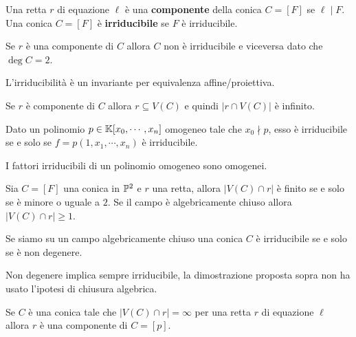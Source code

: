 \begin{multicols*}{2}
    \begin{definition}
    Una retta $r$ di equazione $\ell$ \`e una \textbf{componente} della conica $C=[F]$ se $\ell\mid F$.\\
    Una conica $C=[F]$ \`e \textbf{irriducibile} se $F$ \`e irriducibile.
    \end{definition}
    \begin{remark}
    Se $r$ \`e una componente di $C$ allora $C$ non \`e irriducibile e viceversa dato che $\deg C=2$.
    \end{remark}
    \begin{remark}
    L'irriducibilit\`a \`e un invariante per equivalenza affine/proiettiva.
    \end{remark}
    \begin{remark}
    Se $r$ \`e componente di $C$ allora $r\subseteq V(C)$ e quindi $|r\cap V(C)|$ \`e infinito.
    \end{remark}


    \begin{lemma}
    Dato un polinomio $p\in \mathbb{K}[x_0,\cdots,x_n]$ omogeneo tale che $x_0\nmid p$, esso \`e irriducibile se e solo se $f=p(1,x_1,\cdots, x_n)$ \`e irriducibile.
    \end{lemma}
    \begin{remark}
    I fattori irriducibili di un polinomio omogeneo sono omogenei.
    \end{remark}



    \begin{proposition}
    Sia $C=[F]$ una conica in $\mathbb{P}^2$ e $r$ una retta, allora $|V(C)\cap r|$ \`e finito se e solo se \`e minore o uguale a $2$. Se il campo \`e algebricamente chiuso allora $|V(C)\cap r|\geq 1$.
    \end{proposition}



    \begin{proposition}
    Se siamo su un campo algebricamente chiuso una conica $C$ \`e irriducibile se e solo se \`e non degenere.
    \end{proposition}
    \begin{remark}
    Non degenere implica sempre irriducibile, la dimostrazione proposta sopra non ha usato l'ipotesi di chiusura algebrica.
    \end{remark}

    \begin{proposition}
    Se $C$ \`e una conica tale che $|V(C)\cap r|=\infty$ per una retta $r$ di equazione $\ell$ allora $r$ \`e una componente di $C=[p]$.
    \end{proposition}


\end{multicols*}
